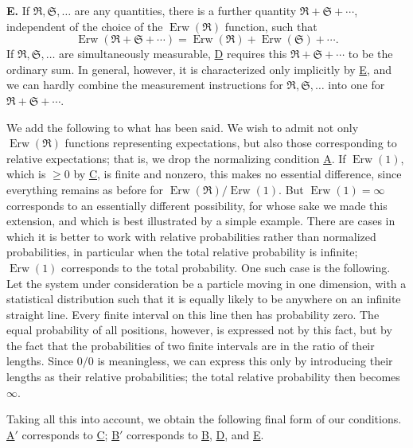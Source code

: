 \documentclass[fontsize=13pt,twoside,openany,headings=normal,parskip=false,bookmarkpackage=false,DIV=calc]{scrbook}
\begin{document}
\noindent{}\textbf{E.}\label{cond:IV.1.E} If $\mathfrak R,\mathfrak S,\ldots$ are any quantities, there is a further quantity $\mathfrak R+\mathfrak S+\cdots$, independent of the choice of the $\operatorname{Erw}(\mathfrak R)$ function, such that
\[
\operatorname{Erw}(\mathfrak R+\mathfrak S+\cdots)=\operatorname{Erw}(\mathfrak R)+\operatorname{Erw}(\mathfrak S)+\cdots.
\]
If $\mathfrak R,\mathfrak S,\ldots$ are simultaneously measurable, \hyperref[cond:IV.1.D]{D} requires this $\mathfrak R+\mathfrak S+\cdots$ to be the ordinary sum. In general, however, it is characterized only implicitly by \hyperref[cond:IV.1.E]{E}, and we can hardly combine the measurement instructions for $\mathfrak R,\mathfrak S,\ldots$ into one for $\mathfrak R+\mathfrak S+\cdots$.

We add the following to what has been said. We wish to admit not only $\operatorname{Erw}(\mathfrak R)$ functions representing expectations, but also those corresponding to relative expectations; that is, we drop the normalizing condition \hyperref[cond:IV.1.A]{A}. If $\operatorname{Erw}(1)$, which is $\geq0$ by \hyperref[cond:IV.1.C]{C}, is finite and nonzero, this makes no essential difference, since everything remains as before for $\operatorname{Erw}(\mathfrak R)/\operatorname{Erw}(1)$. But $\operatorname{Erw}(1)=\infty$ corresponds to an essentially different possibility, for whose sake we made this
\hypertarget{origpage-165}{}%
extension, and which is best illustrated by a simple example. There are cases in which it is better to work with relative probabilities rather than normalized probabilities, in particular when the total relative probability is infinite; $\operatorname{Erw}(1)$ corresponds to the total probability. One such case is the following. Let the system under consideration be a particle moving in one dimension, with a statistical distribution such that it is equally likely to be anywhere on an infinite straight line. Every finite interval on this line then has probability zero. The equal probability of all positions, however, is expressed not by this fact, but by the fact that the probabilities of two finite intervals are in the ratio of their lengths. Since $0/0$ is meaningless, we can express this only by introducing their lengths as their relative probabilities; the total relative probability then becomes $\infty$.

Taking all this into account, we obtain the following final form of our conditions. \hyperref[cond:IV.Aprime]{A$'$} corresponds to \hyperref[cond:IV.1.C]{C}; \hyperref[cond:IV.Bprime]{B$'$} corresponds to \hyperref[cond:IV.1.B]{B}, \hyperref[cond:IV.1.D]{D}, and \hyperref[cond:IV.1.E]{E}.
\end{document}
